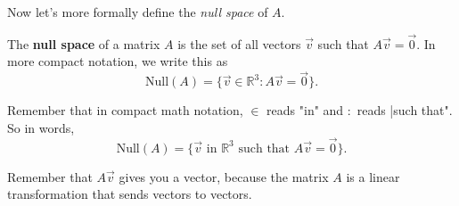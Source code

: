 \documentclass{ximera}
\begin{document}

Now let's more formally define the \emph{null space} of $A$.

\begin{definition}

    The {\bf null space} of a matrix $A$ is the set of all vectors $\vec{v}$ such that $A\vec{v} = \vec{0}$. In more compact notation, we write this as 
    $$\text{Null}(A) = \{ \vec{v} \in \mathbb{R}^3 : A\vec{v} = \vec{0} \}.$$

    \begin{hint}

        Remember that in compact math notation, $\in$ reads "in" and $:$ reads |such that". So in words, $$\text{Null}(A) = \{ \vec{v} \text{ in } \mathbb{R}^3 \text{ such that } A\vec{v} = \vec{0} \}.$$

        Remember that $A\vec{v}$ gives you a vector, because the matrix $A$ is a linear transformation that sends vectors to vectors.

    \end{hint}

\end{definition}
\end{document}
